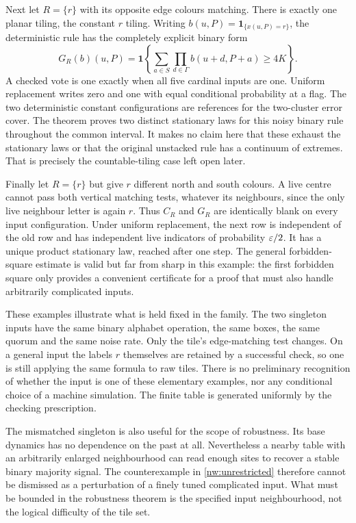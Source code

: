Next let $R=\{r\}$ with its opposite edge colours matching. There is exactly one planar tiling, the constant $r$ tiling. Writing $b(u,P)=\mathbf1_{\{x(u,P)=r\}}$, the deterministic rule has the completely explicit binary form
\[
 G_R(b)(u,P)=\mathbf1\left\{
 \sum_{a\in S}\prod_{d\in\Gamma}b(u+d,P+a)\ge4K\right\}.
\]
A checked vote is one exactly when all five cardinal inputs are one. Uniform replacement writes zero and one with equal conditional probability at a flag. The two deterministic constant configurations are references for the two-cluster error cover. The theorem proves two distinct stationary laws for this noisy binary rule throughout the common interval. It makes no claim here that these exhaust the stationary laws or that the original unstacked rule has a continuum of extremes. That is precisely the countable-tiling case left open later.

Finally let $R=\{r\}$ but give $r$ different north and south colours. A live centre cannot pass both vertical matching tests, whatever its neighbours, since the only live neighbour letter is again $r$. Thus $C_R$ and $G_R$ are identically blank on every input configuration. Under uniform replacement, the next row is independent of the old row and has independent live indicators of probability $\varepsilon/2$. It has a unique product stationary law, reached after one step. The general forbidden-square estimate is valid but far from sharp in this example: the first forbidden square only provides a convenient certificate for a proof that must also handle arbitrarily complicated inputs.

These examples illustrate what is held fixed in the family. The two singleton inputs have the same binary alphabet operation, the same boxes, the same quorum and the same noise rate. Only the tile's edge-matching test changes. On a general input the labels $r$ themselves are retained by a successful check, so one is still applying the same formula to raw tiles. There is no preliminary recognition of whether the input is one of these elementary examples, nor any conditional choice of a machine simulation. The finite table is generated uniformly by the checking prescription.

The mismatched singleton is also useful for the scope of robustness. Its base dynamics has no dependence on the past at all. Nevertheless a nearby table with an arbitrarily enlarged neighbourhood can read enough sites to recover a stable binary majority signal. The counterexample in \cref{nw:unrestricted} therefore cannot be dismissed as a perturbation of a finely tuned complicated input. What must be bounded in the robustness theorem is the specified input neighbourhood, not the logical difficulty of the tile set.
